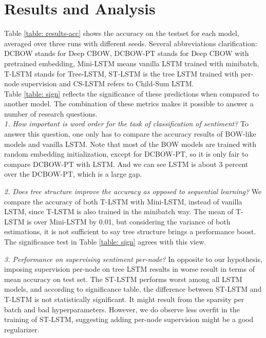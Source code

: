 \section{Results and Analysis}
\label{sec: results}
Table \ref{table: results-acc} shows the accuracy on the testset for each model,
averaged over three runs with different seeds. Several abbreviations
clarification: DCBOW stands for Deep CBOW, DCBOW-PT stands for Deep CBOW with
pretrained embedding, Mini-LSTM means vanilla LSTM trained with minibatch,
T-LSTM stands for Tree-LSTM, ST-LSTM is the tree LSTM trained with per-node
supervision and CS-LSTM refers to Child-Sum LSTM. \\ Table \ref{table: sign}
reflects the significance of these predictions when compared to another model.
The combination of these metrics makes it possible to answer a number of
research questions. \\
    \textit{1. How important is word order for the task of classification of
    sentiment?} To answer this question, one only has to compare the accuracy
    results of BOW-like models and vanilla LSTM. Note that most of the BOW
    models are trained with random embedding initialization, except for
    DCBOW-PT, so it is only fair to compare DCBOW-PT with LSTM. And we can see
    LSTM is about 3 percent over the DCBOW-PT, which is a large gap.

    \textit{2. Does tree structure improve the accuracy as opposed to
    sequential learning?} We compare the accuracy of both T-LSTM with Mini-LSTM,
    instead of vanilla LSTM, since T-LSTM is also trained in the minibatch way.
    The mean of T-LSTM is over Mini-LSTM by 0.01, but considering the variance
    of both estimations, it is not sufficient to say tree structure brings a
    performance boost. The significance test in Table \ref{table: sign} agrees
    with this view.

    \textit{3. Performance on supervising sentiment per-node?} 
    In opposite to our hypothesis, imposing supervision per-node on tree LSTM
    results in worse result in terms of mean accuracy on test set. The ST-LSTM
    performs worst among all LSTM models, and according to significance table,
    the difference between ST-LSTM and T-LSTM is not statistically significant.
    It might result from the sparsity per batch and bad hyperparameters.
    However, we do observe less overfit in the training of ST-LSTM, suggesting
    adding per-node supervision might be a good regularizer.
    
